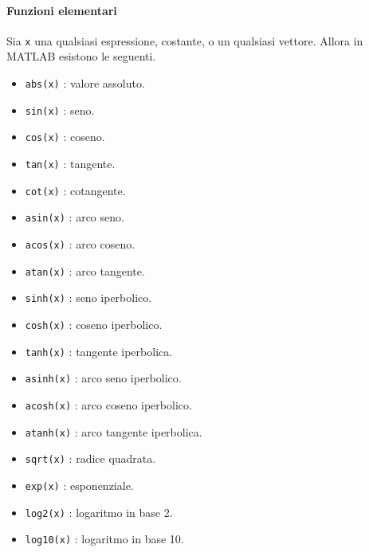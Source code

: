 \paragraph{Funzioni elementari}
Sia \texttt{x} una qualsiasi espressione, costante, o un qualsiasi vettore. Allora in MATLAB esistono le seguenti.
\begin{itemize}	
	
	\item	\texttt{abs(x)} : valore assoluto.
	
	\item	\texttt{sin(x)} : seno.
	
	\item	\texttt{cos(x)} : coseno.
	
	\item	\texttt{tan(x)} : tangente.
	
	\item	\texttt{cot(x)} : cotangente.
	
	\item	\texttt{asin(x)} : arco seno.
	
	\item	\texttt{acos(x)} : arco coseno.
	
	\item	\texttt{atan(x)} : arco tangente.
	
	\item	\texttt{sinh(x)} : seno iperbolico.
	
	\item	\texttt{cosh(x)} : coseno iperbolico.
	
	\item	\texttt{tanh(x)} : tangente iperbolica.
	
	\item	\texttt{asinh(x)} : arco seno iperbolico.
	
	\item	\texttt{acosh(x)} : arco coseno iperbolico.
	
	\item	\texttt{atanh(x)} : arco tangente iperbolica.
	
	\item	\texttt{sqrt(x)} : radice quadrata.
	
	\item	\texttt{exp(x)} : esponenziale.
	
	\item	\texttt{log2(x)} : logaritmo in base 2.

	\item	\texttt{log10(x)} : logaritmo in base 10.
	

\end{itemize}
